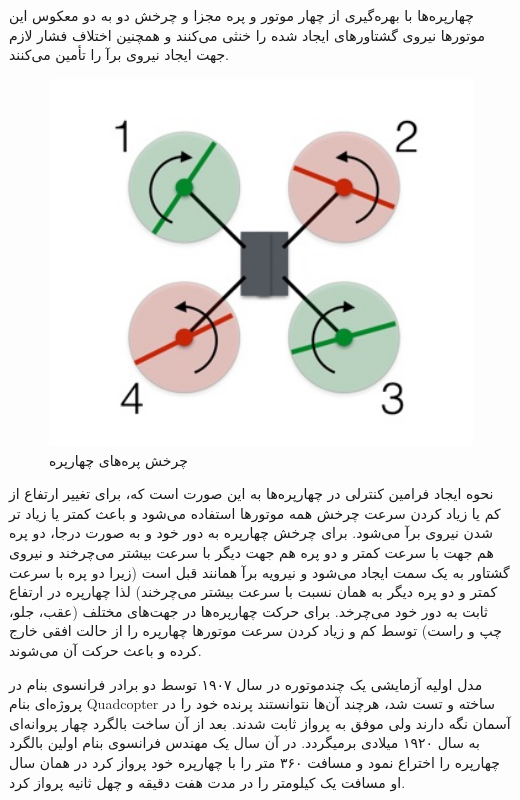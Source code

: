 چهارپره‌ها با بهره‌گیری از چهار موتور و پره مجزا و چرخش دو به دو معکوس این موتورها نیروی گشتاورهای ایجاد شده را خنثی می‌کنند و همچنین اختلاف فشار لازم جهت ایجاد نیروی برآ را تأمین می‌کنند.

\begin{figure}[H]
	\includegraphics[width=12cm]{figs/introduction/Quadblade.jpg}
	\centering
	\caption{چرخش پره‌های چهارپره\cite{Quadhowfly}}
\end{figure}
نحوه ایجاد فرامین کنترلی در چهارپره‌ها به این صورت است که، برای تغییر ارتفاع از کم یا زیاد کردن سرعت چرخش همه موتورها استفاده می‌شود و باعث کمتر یا زیاد تر شدن نیروی برآ می‌شود. برای چرخش چهارپره به دور خود و به صورت درجا، دو پره هم جهت با سرعت کمتر و دو پره هم جهت دیگر با سرعت بیشتر می‌چرخند و نیروی گشتاور به یک سمت ایجاد می‌شود و نیرویه برآ همانند قبل است (زیرا دو پره با سرعت کمتر و دو پره دیگر به همان نسبت با سرعت بیشتر می‌چرخند) لذا چهارپره در ارتفاع ثابت به دور خود می‌چرخد. برای حرکت چهارپره‌ها در جهت‌های مختلف (عقب، جلو، چپ و راست) توسط کم و زیاد کردن سرعت موتورها چهارپره را از حالت افقی خارج کرده و باعث حرکت آن می‌شوند.

مدل‬ اولیه آزمایشی یک چندموتوره در سال ۱۹۰۷ توسط دو برادر فرانسوی بنام  در پروژه‌ای بنام Quadcopter ساخته و تست شد، هرچند آن‌ها نتوانستند پرنده خود را در آسمان نگه دارند ولی موفق به پرواز ثابت شدند. بعد از آن ساخت بالگرد چهار پروانه‌ای به سال ۱۹۲۰ میلادی برمیگردد. در آن سال یک مهندس فرانسوی بنام  اولین بالگرد چهارپره را اختراع نمود و مسافت ۳۶۰ متر را با چهارپره خود پرواز کرد در همان سال او مسافت یک کیلومتر را در مدت هفت دقیقه و چهل ثانیه پرواز کرد.

